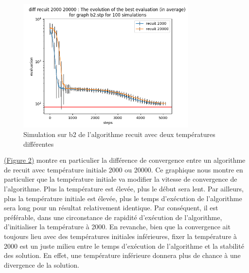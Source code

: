 \documentclass[11pt,french]{report}
\begin{document}
        \begin{figure}
        	\begin{center}
        		\includegraphics[width=0.8\textwidth]{best_b2_evaluation_diff recuit 2000 20000.png}
        	\end{center}
        	\caption{Simulation sur b2 de l'algorithme recuit avec deux températures différentes}
        	\label{Figure2}
        \end{figure}
        
        \hyperref[Figure2]{(Figure 2)} montre en particulier la différence de convergence entre un algorithme de recuit avec température initiale 2000 ou 20000. Ce graphique nous montre en particulier que la température initiale va modifier la vitesse de convergence de l'algorithme. Plus la température est élevée, plus le début sera lent. Par ailleurs, plus la température initiale est élevée, plus le temps d'exécution de l'algorithme sera long pour un résultat relativement identique.
        Par conséquent, il est préférable, dans une circonstance de rapidité d'exécution de l'algorithme, d'initialiser la température à 2000.
        En revanche, bien que la convergence ait toujours lieu avec des températures initiales inférieures, fixer la température à 2000 est un juste milieu entre le temps d'exécution de l'algorithme et la stabilité des solution. En effet, une température inférieure donnera plus de chance à une divergence de la solution.\\
        
\end{document}
